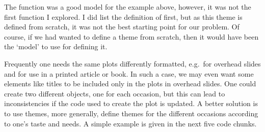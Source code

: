 \documentclass[krantz2]{krantz}\usepackage{knitr}%
\begin{document}
\begin{explainbox}
The function  was a good model for the example above, however, it was not the first function I explored. I did list the definition of  first, but as this theme is defined from scratch, it was not the best starting point for our problem. Of course, if we had wanted to define a theme from scratch, then it would have been the `model' to use for defining it.
\end{explainbox}

Frequently one needs the same plots differently formatted, e.g.\ for overhead slides and for use in a printed article or book. In such a case, we may even want some elements like titles to be included only in the plots in overhead slides. One could create two different  objects, one for each occasion, but this can lead to inconsistencies if the code used to create the plot is updated. A better solution is to use themes, more generally, define themes for the different occasions according to one's taste and needs. A simple example is given in the next five code chunks.

\begin{knitrout}\footnotesize
{}\color{fgcolor}\begin{kframe}
\begin{alltt}
 \hlkwb{<-}
     \hlstd{(} \hlstd{=} \hlstd{,}  \hlstd{=} \hlstd{) \{}
        \hlstd{(}    \hlopt{+}
            \hlstd{(} \hlstd{=} \hlstd{(} \hlstd{=} \hlstd{),}  \hlstd{=} \hlstd{)}
    \hlstd{\}}

 \hlkwb{<-}
     \hlstd{(} \hlstd{=} \hlstd{,}  \hlstd{=} \hlstd{) \{}
        \hlstd{(}    \hlopt{+}
            \hlstd{(} \hlstd{=} \hlstd{(),}
                   \hlstd{=} \hlstd{(),}
                   \hlstd{=} \hlstd{)}
    \hlstd{\}}
\end{alltt}
\end{kframe}
\end{knitrout}
\end{document}
